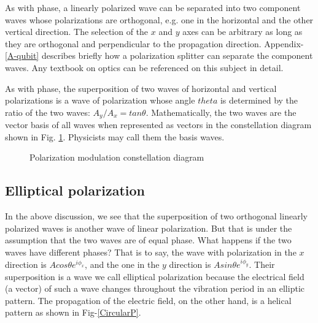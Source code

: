 \documentclass[oneside, letter, 12pt]{book}
\begin{document}
As with phase, a linearly polarized wave can be separated into two component waves whose polarizations are orthogonal, e.g. one in the horizontal and the other vertical direction. The selection of the $x$ and $y$ axes can be arbitrary as long as they are orthogonal and perpendicular to the propagation direction. Appendix-\ref{A-qubit} describes briefly how a polarization splitter can separate the component waves. Any textbook on optics can be referenced on this subject in detail.

As with phase, the superposition of two waves of horizontal and vertical polarizations is a wave of polarization whose angle $theta$ is determined by the ratio of the two waves: $A_y/A_x = tan\theta$. Mathematically, the two waves are the vector basis of all waves when represented as vectors in the constellation diagram shown in Fig. \ref{PolarM}. Physicists may call them the basis waves.

\begin{figure}[h]\label{PolarM}
\caption{Polarization modulation constellation diagram}
\end{figure}

\subsection{Elliptical polarization}\label{s-elliptic}
In the above discussion, we see that the superposition of two orthogonal linearly polarized waves is another wave of linear polarization. But that is under the assumption that the two waves are of equal phase. What happens if the two waves have different phases? That is to say, the wave with polarization in the $x$ direction is $A cos\theta e^{i\phi_x}$, and the one in the $y$ direction is $A sin\theta e^{i\phi_y}$. Their superposition is a wave we call elliptical polarization because the electrical field (a vector) of such a wave changes throughout the vibration period in an elliptic pattern. The propagation of the electric field, on the other hand, is a helical pattern as shown in Fig-\ref{CircularP}.
\end{document}
